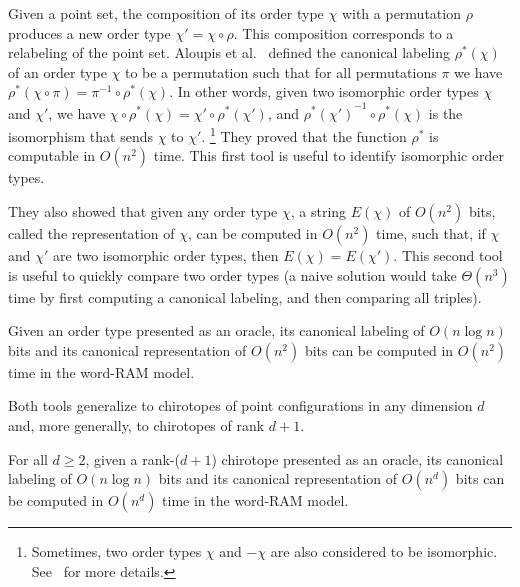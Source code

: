 
Given a point set, the composition of its order type \(\chi\) with a
permutation \(\rho\) produces a new order type \(\chi' = \chi \circ \rho\).
This composition corresponds to a relabeling of the point set.
%
Aloupis et al.~\cite{AILOW14} defined the canonical labeling \(\rho^*(\chi)\)
of an order type \(\chi\) to be a permutation such that for all permutations
\(\pi\) we have \(\rho^*(\chi \circ \pi) = \pi^{-1} \circ \rho^*(\chi)\).
In other words, given two isomorphic order types \(\chi\) and \(\chi'\), we
have \(\chi \circ \rho^*(\chi) = \chi' \circ \rho^*(\chi')\), and
\({\rho^*(\chi')}^{-1} \circ \rho^*(\chi)\) is the isomorphism that sends
\(\chi\) to \(\chi'\).%
\footnote{Sometimes, two order types \(\chi\) and \(- \chi\) are also considered
to be isomorphic. See~\cite{AILOW14} for more details.}
They proved that the function \(\rho^*\) is
computable in \(O(n^2)\) time.
%
This first tool is useful to identify isomorphic order types.

They also showed that given any order type \(\chi\), a string \(E(\chi)\) of
\(O(n^2)\) bits, called the representation of \(\chi\), can be computed in
\(O(n^2)\) time, such that, if \(\chi\) and \(\chi'\) are two isomorphic order
types, then \(E(\chi) = E(\chi')\).
%
This second tool is useful to quickly compare two order types (a naive solution
would take \(\Theta(n^3)\) time by first computing a canonical labeling, and
then comparing all triples).

\begin{lemma}\label{lem:canonical-labeling}
  Given an order type presented as an oracle,
  its canonical labeling of \(O(n \log n)\) bits
  and
  its canonical representation of \(O(n^2)\) bits
  can be computed in \(O(n^2)\) time
  in the word-RAM model.
\end{lemma}

Both tools generalize to chirotopes of point configurations in any dimension
\(d\) and, more generally, to chirotopes of rank \(d+1\).

\begin{lemma}\label{lem:canonical-labeling-d}
  For all \(d \geq 2\),
  given a rank-(\(d+1\)) chirotope presented as an oracle,
  its canonical labeling of \(O(n \log n)\) bits
  and
  its canonical representation of \(O(n^d)\) bits
  can be computed in \(O(n^d)\) time
  in the word-RAM model.
\end{lemma}
